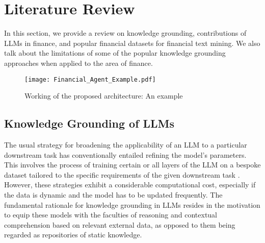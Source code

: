 \section{Literature Review}
\label{sec:kg-survey}
In this section, we provide a review on knowledge grounding, contributions of LLMs in finance, and popular financial datasets for financial text mining. We also talk about the limitations of some of the popular knowledge grounding approaches when applied to the area of finance.

\begin{figure}[t]
  \centering %
  \texttt{[image: Financial\_Agent\_Example.pdf]}
  \caption{Working of the proposed architecture: An example}
  \label{fig:Financial Agent-exmp}
\end{figure}

\subsection{Knowledge Grounding of LLMs}
The usual strategy for broadening the applicability of an LLM to a particular downstream task has conventionally entailed refining the model's parameters. This involves the process of training certain or all layers of the LLM on a bespoke dataset tailored to the specific requirements of the given downstream task \citep{radford2019language}. However, these strategies exhibit a considerable computational cost, especially if the data is dynamic and the model has to be updated frequently. %
The fundamental rationale for knowledge grounding in LLMs resides in the motivation to equip these models with the faculties of reasoning and contextual comprehension based on relevant external data, as opposed to them being regarded as repositories of static knowledge.

